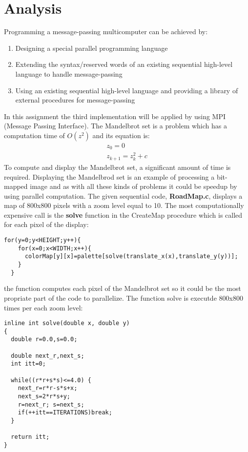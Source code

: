 \documentclass[11pt,conference]{IEEEtran}
\begin{document}
\section{Analysis}
\cite{citation3}Programming a message-passing multicomputer can be achieved by:
\begin{enumerate}
\item Designing a special parallel programming language
\item Extending the syntax/reserved words of an existing sequential high-level language to handle message-passing
\item Using an existing sequential high-level language and providing a library of external procedures for message-passing
\end{enumerate}
In this assignment the third implementation will be applied by using MPI (Message Passing Interface).
\newline
The Mandelbrot set is a problem which has a computation time of $O(z^{2})$ and its equation is:
\newline
\begin{eqnarray}
z_{0} = 0 \\ z_{k+1} = z_{k}^{2} + c
\end{eqnarray}
\newline
To compute and display the Mandelbrot set, a significant amount of time is required. Displaying the Mandelbrod set is an example of processing a bit-mapped image and as with all these kinds of problems it could be speedup by using parallel computation.
\newline
The given sequential code, \textbf{RoadMap.c}, displays a map of 800x800 pixels with a zoom level equal to 10.
\newline
The most computationally expensive call is the \textbf{solve} function in the CreateMap procedure which is called for each pixel of the display:
\begin{lstlisting}
for(y=0;y<HEIGHT;y++){
    for(x=0;x<WIDTH;x++){
      colorMap[y][x]=palette[solve(translate_x(x),translate_y(y))];
    }
  }
\end{lstlisting}
the function computes each pixel of the Mandelbrot set so it could be the most propriate part of the code to parallelize. The function solve is executde 800x800 times per each zoom level:
\begin{lstlisting}
inline int solve(double x, double y)
{
  double r=0.0,s=0.0;

  double next_r,next_s;
  int itt=0;
  
  while((r*r+s*s)<=4.0) {
    next_r=r*r-s*s+x;
    next_s=2*r*s+y;
    r=next_r; s=next_s;
    if(++itt==ITERATIONS)break;
  }
  
  return itt;
}
\end{lstlisting}
\end{document}
